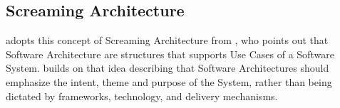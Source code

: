 \subsection{Screaming Architecture}

 adopts this concept of Screaming Architecture from
\textcite{jacobson_object-oriented_1992}, who points out that Software Architecture are
structures that supports Use Cases of a Software System.
\textcite[195]{robert_c_martin_clean_2018} builds on that idea describing that Software
Architectures should emphasize the intent, theme and purpose of the System, rather than
being dictated by frameworks, technology, and delivery mechanisms. 